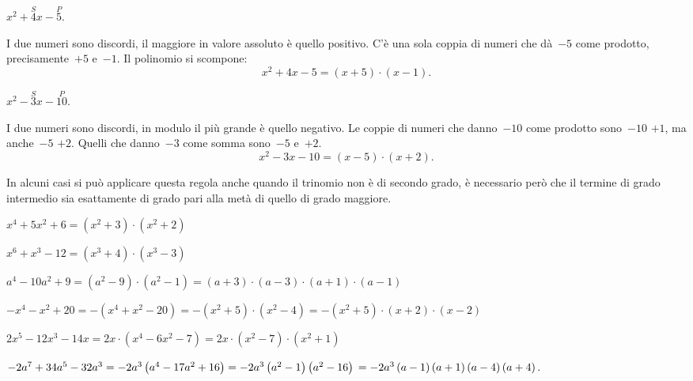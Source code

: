 \begin{esempio}
 $x^{2}+\overset{S}{4}x-\overset{P}{5}.$

I due numeri sono discordi, il maggiore in valore assoluto è quello
positivo. C'è una sola coppia di numeri che dà~$-5$
come prodotto, precisamente~$+5$ e~$-1$. Il polinomio si scompone:
\[x^{2}+4x-5=\left(x+5\right)\cdot \left(x-1\right).\]
\end{esempio}

\begin{esempio}
 $x^{2}-\overset{S}{3}x-\overset{P}{10}.$

I due numeri sono discordi, in modulo il più grande è quello
negativo. Le coppie di numeri che danno~$-10$ come prodotto sono~$-10$ $+1$,
ma anche~$-5$ $+2$. Quelli che danno~$-3$ come somma sono~$-5$ e~$+2$.
\[x^{2}-3x-10=\left(x-5\right)\cdot \left(x+2\right).\]
\end{esempio}

\begin{esempio}
 In alcuni casi si può applicare questa regola anche quando il trinomio
non è di secondo grado, è necessario però che il termine di grado
intermedio sia esattamente di grado pari alla metà di quello di grado
maggiore.

\begin{itemize*}
\item $x^{4}+5x^{2}+6=\left(x^{2}+3\right)\cdot \left(x^{2}+2\right)$
\item $x^{6}+x^{3}-12=\left(x^{3}+4\right)\cdot \left(x^{3}-3\right)$
\item $a^{4}-10a^{2}+9=\left(a^{2}-9\right)\cdot\left(a^{2}-1\right)=
       \left(a+3\right)\cdot \left(a-3\right)\cdot 
       \left(a+1\right)\cdot\left(a-1\right)$
\item $-x^{4}-x^{2}+20=-\left(x^{4}+x^{2}-20\right)=
       -\left(x^{2}+5\right)\cdot\left(x^{2}-4\right)=
       -\left(x^{2}+5\right)\cdot\left(x+2\right)\cdot \left(x-2\right)$
\item $2x^{5}-12x^{3}-14x=2x\cdot \left(x^{4}-6x^{2}-7\right)=2x\cdot%
\left(x^{2}-7\right)\cdot \left(x^{2}+1\right)$
\item $-2a^{7}+34a^{5}-32a^{3}=-2a^{3}\left(a^{4}-17a^{2}+16\right)
    =-2a^{3}\left(a^{2}-1\right)\left(a^{2}-16\right)\\
    =-2a^{3}\left(a-1\right)\left(a+1\right)\left(a-4\right)\left(a+4\right).$
\end{itemize*}
\end{esempio}


